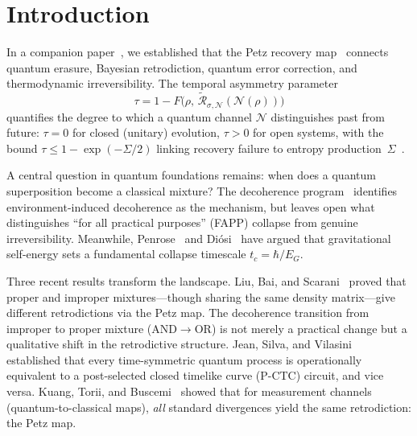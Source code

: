 \documentclass[prl,twocolumn,superscriptaddress,longbibliography,floatfix]{revtex4-2}
\newcommand{\Petz}{\mathcal{R}}
\newcommand{\chan}{\mathcal{N}}
\newcommand{\tauasym}{\tau}
\begin{document}
\section{Introduction}
\label{sec:intro}

In a companion paper~\cite{Paper1}, we established that the Petz
recovery map~\cite{Petz1986,Petz1988} connects quantum erasure,
Bayesian retrodiction, quantum error correction, and thermodynamic
irreversibility.  The temporal asymmetry parameter
\begin{equation}
\tauasym = 1 - F\!\big(\rho,\,
  \tilde{\Petz}_{\sigma,\chan}(\chan(\rho))\big)
\label{eq:tau_def}
\end{equation}
quantifies the degree to which a quantum channel $\chan$ distinguishes
past from future: $\tauasym = 0$ for closed (unitary) evolution,
$\tauasym > 0$ for open systems, with the bound
$\tauasym \leq 1 - \exp(-\Sigma/2)$ linking recovery failure to
entropy production~$\Sigma$~\cite{Junge2018,Fawzi2015}.

A central question in quantum foundations remains: when does a quantum
superposition become a classical mixture?  The decoherence
program~\cite{Zurek2003,Joos1985,Schlosshauer2007} identifies
environment-induced decoherence as the mechanism, but leaves open
what distinguishes ``for all practical purposes'' (FAPP) collapse
from genuine irreversibility.  Meanwhile, Penrose~\cite{Penrose1996}
and Di\'{o}si~\cite{Diosi1987} have argued that gravitational
self-energy sets a fundamental collapse timescale $t_c = \hbar/E_G$.

Three recent results transform the landscape.  Liu, Bai, and
Scarani~\cite{Liu2026} proved that proper and improper mixtures---though
sharing the same density matrix---give different retrodictions via the
Petz map.  The decoherence transition from improper to proper mixture
(AND$\to$OR) is not merely a practical change but a qualitative shift
in the retrodictive structure.  Jean, Silva, and
Vilasini~\cite{Jean2025} established that every time-symmetric quantum
process is operationally equivalent to a post-selected closed timelike
curve (P-CTC) circuit, and vice versa.  Kuang, Torii, and
Buscemi~\cite{Kuang2025} showed that for measurement channels (quantum-to-classical maps), \emph{all} standard divergences yield the same
retrodiction: the Petz map.
\end{document}
